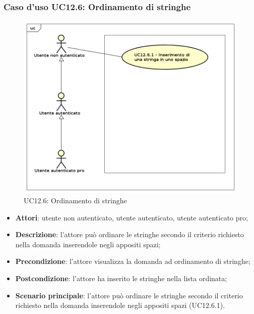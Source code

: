 \subsubsection{Caso d'uso UC12.6: Ordinamento di stringhe}
\label{UC12.6}
\begin{figure}[h]
	\centering
	\includegraphics[scale=0.5]{UML/UC12_6.png}
	\caption{UC12.6: Ordinamento di stringhe}
\end{figure}
\begin{itemize}
\item \textbf{Attori}: utente non autenticato, utente autenticato, utente autenticato pro;
\item \textbf{Descrizione}: l'attore può ordinare le stringhe secondo il criterio richiesto nella domanda inserendole negli appositi spazi;
\item \textbf{Precondizione}: l'attore visualizza la domanda ad ordinamento di stringhe;
\item \textbf{Postcondizione}: l'attore ha inserito le stringhe nella lista ordinata;
\item \textbf{Scenario principale}: l'attore può ordinare le stringhe secondo il criterio richiesto nella domanda inserendole negli appositi spazi (UC12.6.1).
\end{itemize}

\newpage
